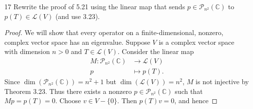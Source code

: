 \documentclass[11pt]{extarticle}
\newenvironment{problem}[1]{\begin{prob*}{#1}{}}{\end{prob*}}
\newcommand{\C}{\mathbb{C}}
\newcommand{\poly}{\mathcal{P}}
\newcommand{\Hom}{\mathcal{L}}
\begin{document}
\begin{problem}{17}
Rewrite the proof of 5.21 using the linear map that sends $p\in\poly_{n^2}(\C)$ to $p(T)\in\Hom(V)$ (and use 3.23).
\end{problem}
\begin{proof}
We will show that every operator on a finite-dimensional, nonzero, complex vector space has an eigenvalue.  Suppose $V$ is a complex vector space with dimension $n > 0$ and $T\in\Hom(V)$.  Consider the linear map
\begin{align*}
M: \poly_{n^2}(\C) &\to \Hom(V)\\
         p &\mapsto p(T).
\end{align*}
Since $\dim\left(\poly_{n^2}(\C)\right)=n^2 +1$ but $\dim\left(\Hom(V)\right) = n^2$, $M$ is not injective by Theorem 3.23.  Thus there exists a nonzero $p\in\poly_{n^2}(\C)$ such that $Mp = p(T) = 0$.  Choose $v\in V-\{0\}$.  Then $p(T)v = 0$, and hence
\end{proof}
\end{document}
